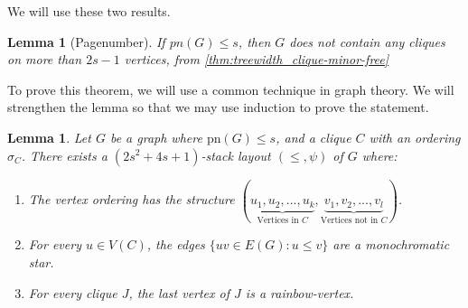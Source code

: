 \documentclass[]{report}
\newcommand{\pn}{\text{pn}}
\newtheorem{lemma}[theorem]{Lemma}
\theoremstyle{definition}
\numberwithin{theorem}{section}
\numberwithin{equation}{section}
\begin{document}
We will use these two results.
\begin{lemma}[Pagenumber]
	If $pn(G) \leq s$, then $G$ does not contain any cliques on more than $2s-1$ vertices, from \cref{thm:treewidth_clique-minor-free}
\end{lemma}

To prove this theorem, we will use a common technique in graph theory. We will strengthen the lemma so that we may use induction to prove the statement.
\begin{lemma}\label{lem:Hickingbotham_Lemma}
	Let $G$ be a graph where $\pn(G) \leq s$, and a clique $C$ with an ordering $\sigma_C$. There exists a $(2s^2 + 4s + 1)$-stack layout $(\leq, \psi)$ of $G$ where:
	\begin{enumerate}
		\item The vertex ordering has the structure $(\underbrace{u_1, u_2, ..., u_k}_{\text{Vertices in } C}, \underbrace{v_1, v_2, ..., v_l}_{\text{Vertices not in }C})$. 
		\item For every $u \in V(C)$, the edges $\lbrace uv \in E(G) : u \leq v \rbrace$ are a monochromatic star. 
		\item For every clique $J$, the last vertex of $J$ is a rainbow-vertex. 
	\end{enumerate}
\end{lemma}
\end{document}
